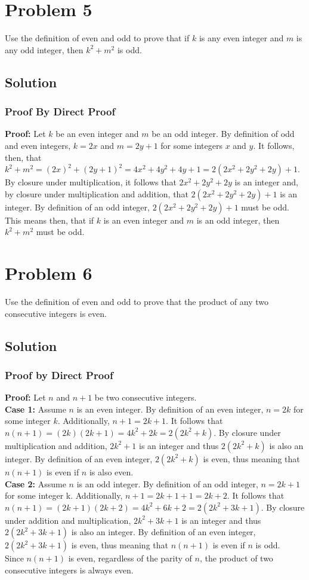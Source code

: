 \documentclass[table]{article}
\begin{document}
\section{Problem 5}
Use the definition of even and odd to prove that if $k$ is any even integer and $m$ is any odd
integer, then $k^2 + m^2$ is odd.
\subsection{Solution}
\subsubsection{Proof By Direct Proof}
\textbf{Proof:} Let $k$ be an even integer and $m$ be an odd integer. By definition of odd and even integers, $k=2x$ and $m=2y+1$ for some integers $x$ and $y$. It follows, then, that $k^2 + m^2 = (2x)^2 + (2y+1)^2 = 4x^2 + 4y^2 + 4y + 1 = 2(2x^2 + 2y^2 + 2y) + 1$. By closure under multiplication, it follows that $2x^2 + 2y^2 + 2y$ is an integer and, by closure under multiplication and addition, that $2(2x^2 + 2y^2 + 2y) + 1$ is an integer. By definition of an odd integer, $2(2x^2 + 2y^2 + 2y) + 1$ must be odd. This means then, that if $k$ is an even integer and $m$ is an odd integer, then $k^2 + m^2$ must be odd.
\section{Problem 6}
Use the definition of even and odd to prove that the product of any two consecutive
integers is even.
\subsection{Solution}
\subsubsection{Proof by Direct Proof}
\textbf{Proof:} Let $n$ and $n+1$ be two consecutive integers.\\
\textbf{Case 1:} Assume $n$ is an even integer. By definition of an even integer, $n = 2k$ for some integer $k$. Additionally, $n+1=2k+1$. It follows that $n(n+1)=(2k)(2k+1)=4k^2+2k=2(2k^2+k)$. By closure under multiplication and addition, $2k^2+1$ is an integer and thus $2(2k^2+k)$ is also an integer. By definition of an even integer, $2(2k^2+k)$ is even, thus meaning that $n(n+1)$ is even if $n$ is also even.\\
\textbf{Case 2:} Assume $n$ is an odd integer. By definition of an odd integer, $n = 2k+1$ for some integer k. Additionally, $n+1=2k+1+1=2k+2$. It follows that $n(n+1)=(2k+1)(2k+2)=4k^2+6k+2=2(2k^2+3k+1)$. By closure under addition and multiplication, $2k^2+3k+1$ is an integer and thus $2(2k^2+3k+1)$ is also an integer. By definition of an even integer, $2(2k^2+3k+1)$ is even, thus meaning that $n(n+1)$ is even if $n$ is odd.\\
Since $n(n+1)$ is even, regardless of the parity of $n$, the product of two consecutive integers is always even.
\end{document}
